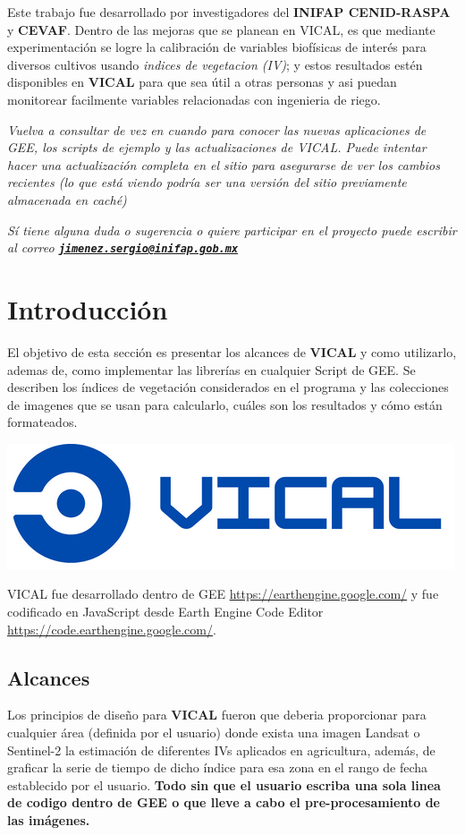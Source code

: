 \documentclass[
]{book}
\begin{document}
Este trabajo fue desarrollado por investigadores del \textbf{INIFAP CENID-RASPA} y \textbf{CEVAF}. Dentro de las mejoras que se planean en VICAL, es que mediante experimentación se logre la calibración de variables biofísicas de interés para diversos cultivos usando \emph{indices de vegetacion (IV)}; y estos resultados estén disponibles en \textbf{VICAL} para que sea útil a otras personas y asi puedan monitorear facilmente variables relacionadas con ingenieria de riego.

\emph{Vuelva a consultar de vez en cuando para conocer las nuevas aplicaciones de GEE, los scripts de ejemplo y las actualizaciones de VICAL. Puede intentar hacer una actualización completa en el sitio para asegurarse de ver los cambios recientes (lo que está viendo podría ser una versión del sitio previamente almacenada en caché)}

\emph{Sí tiene alguna duda o sugerencia o quiere participar en el proyecto puede escribir al correo \textbf{\href{mailto:jimenez.sergio@inifap.gob.mx}{\nolinkurl{jimenez.sergio@inifap.gob.mx}}}}

\hypertarget{intro}{%
\chapter{Introducción}\label{intro}}

El objetivo de esta sección es presentar los alcances de \textbf{VICAL} y como utilizarlo, ademas de, como implementar las librerías en cualquier Script de GEE. Se describen los índices de vegetación considerados en el programa y las colecciones de imagenes que se usan para calcularlo, cuáles son los resultados y cómo están formateados.

\includegraphics[width=0.25\linewidth]{./images/1}

VICAL fue desarrollado dentro de GEE \url{https://earthengine.google.com/} y fue codificado en JavaScript desde Earth Engine Code Editor \url{https://code.earthengine.google.com/}.

\hypertarget{alcances}{%
\section{Alcances}\label{alcances}}

Los principios de diseño para \textbf{VICAL} fueron que deberia proporcionar para cualquier área (definida por el usuario) donde exista una imagen Landsat o Sentinel-2 la estimación de diferentes IVs aplicados en agricultura, además, de graficar la serie de tiempo de dicho índice para esa zona en el rango de fecha establecido por el usuario. \textbf{Todo sin que el usuario escriba una sola linea de codigo dentro de GEE o que lleve a cabo el pre-procesamiento de las imágenes.}
\end{document}
